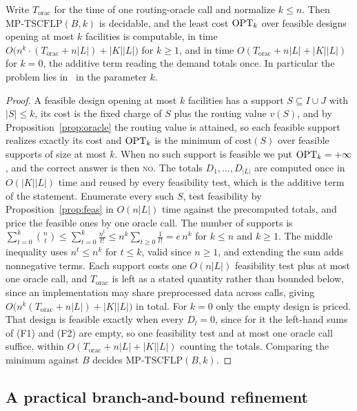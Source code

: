 \begin{theorem}\label{thm:xp}
Write $T_{\mathrm{orac}}$ for the time of one routing-oracle call and
normalize $k\le n$. Then $\mathrm{MP\text{-}TSCFLP}(B,k)$ is decidable,
and the least cost $\mathrm{OPT}_k$ over feasible designs opening at most $k$
facilities is computable, in time $O\bigl(n^{k}\cdot
(T_{\mathrm{orac}}+n|L|)+|K||L|\bigr)$ for $k\ge 1$, and in time
$O(T_{\mathrm{orac}}+n|L|+|K||L|)$
for $k=0$, the additive term reading the demand totals once. In particular the problem lies in \XP\ in the parameter $k$.
\end{theorem}
\begin{proof}
A feasible design opening at most $k$ facilities has a
support
$S\subseteq I\cup J$ with $|S|\le k$, its cost is the fixed charge of $S$
plus the routing value $v(S)$, and by Proposition~\ref{prop:oracle} the
routing value is attained, so each feasible support realizes exactly its
cost and $\mathrm{OPT}_k$ is the minimum of $\mathrm{cost}(S)$ over feasible
supports of size at most $k$. When no such support is feasible we put
$\mathrm{OPT}_k=+\infty$, and the correct answer is then \textsc{no}. The totals $D_1,\dots,D_{|L|}$ are computed once in $O(|K||L|)$ time
and reused by every feasibility test, which is the additive term of the
statement. Enumerate
every such $S$, test feasibility
by Proposition~\ref{prop:feas} in $O(n|L|)$ time against the
precomputed totals, and price the feasible
ones by one oracle call. The number of supports is
$\sum_{t=0}^{k}\binom{n}{t}\le\sum_{t=0}^{k}\frac{n^{t}}{t!}
\le n^{k}\sum_{t\ge 0}\frac{1}{t!}=e\,n^{k}$
for $k\le n$ and $k\ge 1$. The middle inequality uses $n^{t}\le n^{k}$
for $t\le k$, valid since $n\ge 1$, and extending the sum adds
nonnegative terms. Each support
costs one $O(n|L|)$ feasibility test plus at most one oracle call, and
$T_{\mathrm{orac}}$ is left as a stated quantity rather than bounded
below, since an implementation may share preprocessed data across calls,
giving $O\bigl(n^{k}(T_{\mathrm{orac}}+n|L|)+|K||L|\bigr)$ in total. For
$k=0$ only the empty design is priced. That design is feasible exactly
when every $D_l=0$, since for it the left-hand sums of (F1) and (F2) are
empty, so one feasibility test and at most one oracle call suffice,
within $O(T_{\mathrm{orac}}+n|L|+|K||L|)$ counting the totals. Comparing the minimum
against $B$ decides $\mathrm{MP\text{-}TSCFLP}(B,k)$.
\end{proof}

\subsection{A practical branch-and-bound refinement}\label{sec:bb}

